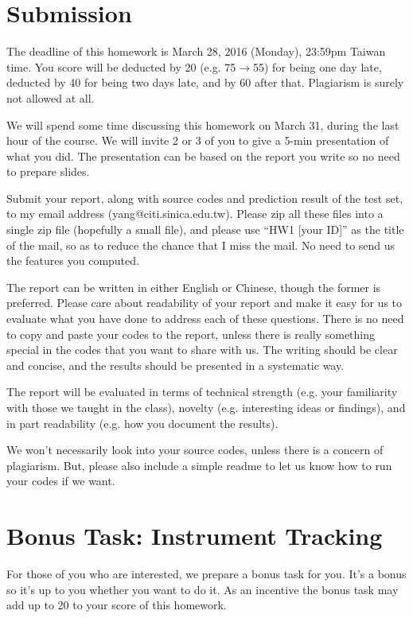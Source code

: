 \documentclass[twoside,a4paper]{refart}
\begin{document}
\section{Submission}

The deadline of this homework is March 28, 2016 (Monday), 23:59pm Taiwan time. You score will be deducted by 20 (e.g. 75$\rightarrow$55) for being one day late, deducted by 40 for being two days late, and by 60 after that. Plagiarism is surely not allowed at all.

We will spend some time discussing this homework on March 31, during the last hour of the course. We will invite 2 or 3 of you to give a 5-min presentation of what you did. The presentation can be based on the report you write so no need to prepare slides.

Submit your report, along with source codes and prediction result of the test set, to my email address (yang@citi.sinica.edu.tw). Please zip all these files into a single zip file (hopefully a small file), and please use ``HW1 [your ID]'' as the title of the mail, so as to reduce the chance that I miss the mail. No need to send us the features you computed.

The report can be written in either English or Chinese, though the former is preferred. Please care about readability of your report and make it easy for us to evaluate what you have done to address each of these questions. There is no need to copy and paste your codes to the report, unless there is really something special in the codes that you want to share with us. The writing should be clear and concise, and the results should be presented in a systematic way.

The report will be evaluated in terms of technical strength (e.g. your familiarity with those we taught in the class), novelty (e.g. interesting ideas or findings), and in part readability (e.g. how you document the results).

We won't necessarily look into your source codes, unless there is a concern of plagiarism. But, please also include a simple readme to let us know how to run your codes if we want.

\section{Bonus Task: Instrument Tracking}

For those of you who are interested, we prepare a bonus task for you.  It's a bonus so it's up to you whether you want to do it. As an incentive the bonus task may add up to 20 to your score of this homework.
\end{document}
